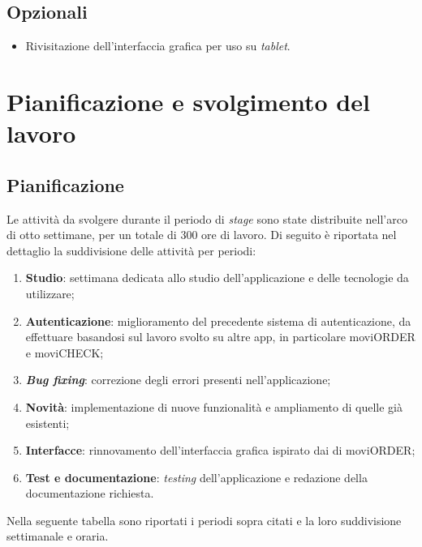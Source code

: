 \subsection{Opzionali}

\begin{itemize}
    \item Rivisitazione dell'interfaccia grafica per uso su \textit{tablet}.
\end{itemize}


\section{Pianificazione e svolgimento del lavoro}

\subsection{Pianificazione}

Le attività da svolgere durante il periodo di \textit{stage} sono state distribuite nell'arco di otto settimane, per un totale di 300 ore di lavoro. Di seguito è riportata nel dettaglio la suddivisione delle attività per periodi:
\begin{enumerate}
    \item \textbf{Studio}: settimana dedicata allo studio dell'applicazione e delle tecnologie da utilizzare;
    \item \textbf{Autenticazione}: miglioramento del precedente sistema di autenticazione, da effettuare basandosi sul lavoro svolto su altre app, in particolare moviORDER e moviCHECK;
    \item \textbf{\textit{Bug fixing}}: correzione degli errori presenti nell'applicazione;
    \item \textbf{Novità}: implementazione di nuove funzionalità e ampliamento di quelle già esistenti;
    \item \textbf{Interfacce}: rinnovamento dell'interfaccia grafica ispirato dai \textit{} di moviORDER;
    \item \textbf{Test e documentazione}: \textit{testing} dell'applicazione e redazione della documentazione richiesta.
\end{enumerate}
Nella seguente tabella sono riportati i periodi sopra citati e la loro suddivisione settimanale e oraria.

